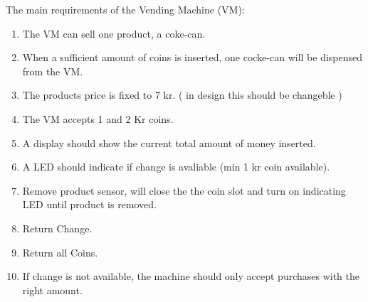 The main requirements of the Vending Machine (VM):

\begin{enumerate}
\item The VM can sell one product, a coke-can.
\item When a sufficient amount of coins is inserted, one cocke-can will be dispensed from the VM.
\item The products price is fixed to 7 kr. ( in design this should be changeble )
\item The VM accepts 1 and 2 Kr coins.
\item A display should show the current total amount of money inserted.
\item A LED should indicate if change is avaliable (min 1 kr coin available).
\item Remove product sensor, will close the the coin slot and turn on indicating LED until product is removed.
\item Return Change.
\item Return all Coins.
\item If change is not available, the machine should only accept purchases with the right amount.
\end{enumerate}

